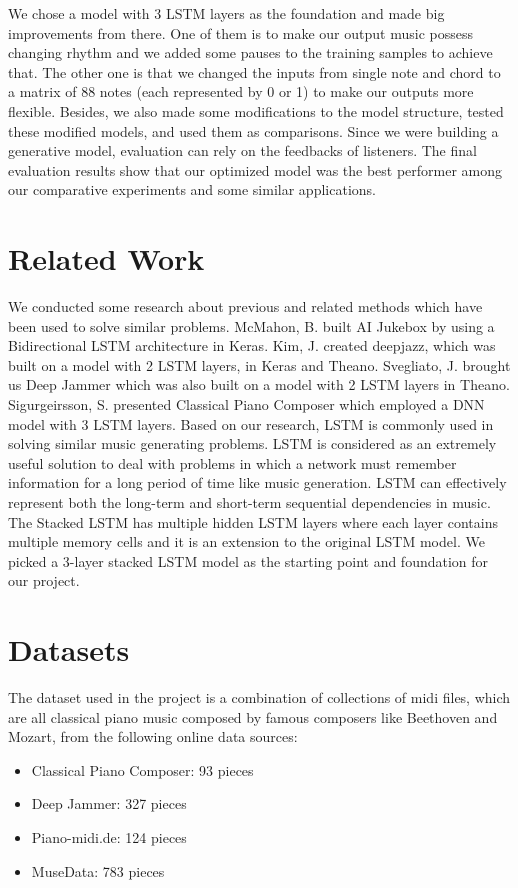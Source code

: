 \documentclass[conference]{IEEEtran}
\begin{document}
We chose a model with 3 LSTM layers as the foundation and made big improvements from there. One of them is to make our output music possess changing rhythm and we added some pauses to the training samples to achieve that. The other one is that we changed the inputs from single note and chord to a matrix of 88 notes (each represented by 0 or 1) to make our outputs more flexible. Besides, we also made some modifications to the model structure, tested these modified models, and used them as comparisons. Since we were building a generative model, evaluation can rely on the feedbacks of listeners. The final evaluation results show that our optimized model was the best performer among our comparative experiments and some similar applications.   


\section{Related Work}

We conducted some research about previous and related methods which have been used to solve similar problems. McMahon, B. built AI Jukebox by using a Bidirectional LSTM architecture in Keras. Kim, J. created deepjazz, which was built on a model with 2 LSTM layers, in Keras and Theano. Svegliato, J. brought us Deep Jammer which was also built on a model with 2 LSTM layers in Theano. Sigurgeirsson, S. presented Classical Piano Composer which employed a DNN model with 3 LSTM layers. Based on our research, LSTM is commonly used in solving similar music generating problems. LSTM is considered as an extremely useful solution to deal with problems in which a network must remember information for a long period of time like music generation. LSTM can effectively represent both the long-term and short-term sequential dependencies in music. The Stacked LSTM has multiple hidden LSTM layers where each layer contains multiple memory cells and it is an extension to the original LSTM model. We picked a 3-layer stacked LSTM model as the starting point and foundation for our project. 

\section{Datasets}
The dataset used in the project is a combination of collections of midi files, which are all classical piano music composed by famous composers like Beethoven and Mozart, from the following online data sources:
\begin{itemize}
\item Classical Piano Composer: 93 pieces
\item Deep Jammer: 327 pieces
\item Piano-midi.de: 124 pieces
\item MuseData: 783 pieces
\end{itemize}
\end{document}
